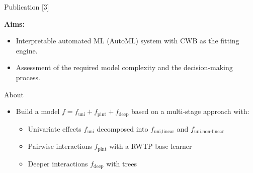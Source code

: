 \documentclass[t,10pt]{beamer}
\begin{document}
\begin{frame}{Publication [3]}
  \vspace{-0.2cm}
  \begin{figure}
    \centering
  \end{figure}
  \vspace{-0.4cm}

  \textbf{Aims:}
  \begin{itemize}
    \item
      Interpretable automated ML (AutoML) system with CWB as the fitting engine.
    \item
      Assessment of the required model complexity and the decision-making process.
  \end{itemize}
\end{frame}


\begin{frame}{About}
  \begin{itemize}
    \item Build a model $f = f_{\text{uni}} + f_{\text{pint}} + f_{\text{deep}}$ based on a multi-stage approach with:
      \begin{itemize}
        \item Univariate effects $f_{\text{uni}}$ decomposed into $f_{\text{uni,linear}}$ and $f_{\text{uni,non-linear}}$
        \item Pairwise interactions $f_{\text{pint}}$ with a RWTP base learner
        \item Deeper interactions $f_{\text{deep}}$ with trees
      \end{itemize}
  \end{itemize}
\end{frame}
\end{document}
